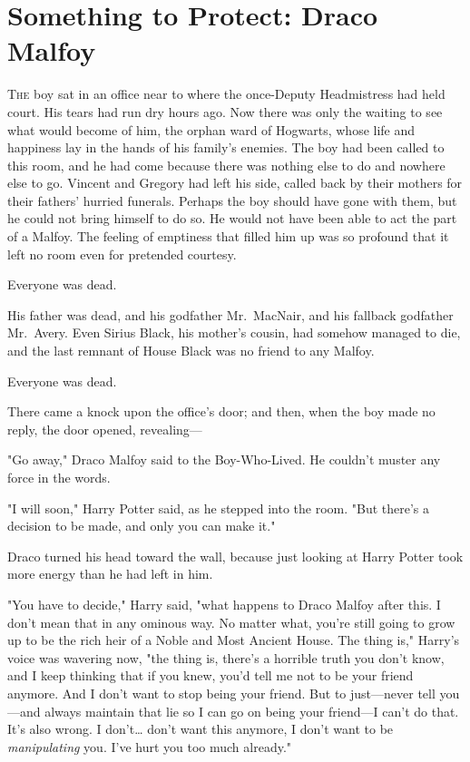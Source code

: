 \chapter{Something to Protect: Draco Malfoy}

\lettrine{T}{he} boy sat in an office near to where the once-Deputy Headmistress had held
court. His tears had run dry hours ago. Now there was only the waiting to see
what would become of him, the orphan ward of Hogwarts, whose life and happiness
lay in the hands of his family's enemies. The boy had been called to this room,
and he had come because there was nothing else to do and nowhere else to go.
Vincent and Gregory had left his side, called back by their mothers for their
fathers' hurried funerals. Perhaps the boy should have gone with them, but he
could not bring himself to do so. He would not have been able to act the part
of a Malfoy. The feeling of emptiness that filled him up was so profound that
it left no room even for pretended courtesy.

Everyone was dead.

His father was dead, and his godfather Mr.~MacNair, and his fallback godfather
Mr.~Avery. Even Sirius Black, his mother's cousin, had somehow managed to die,
and the last remnant of House Black was no friend to any Malfoy.

Everyone was dead.

There came a knock upon the office's door; and then, when the boy made no
reply, the door opened, revealing---

"Go away," Draco Malfoy said to the Boy-Who-Lived. He couldn't muster any force
in the words.

"I will soon," Harry Potter said, as he stepped into the room. "But there's a
decision to be made, and only you can make it."

Draco turned his head toward the wall, because just looking at Harry Potter
took more energy than he had left in him.

"You have to decide," Harry said, "what happens to Draco Malfoy after this. I
don't mean that in any ominous way. No matter what, you're still going to grow
up to be the rich heir of a Noble and Most Ancient House. The thing is,"
Harry's voice was wavering now, "the thing is, there's a horrible truth you
don't know, and I keep thinking that if you knew, you'd tell me not to be your
friend anymore. And I don't want to stop being your friend. But to just---never
tell you---and always maintain that lie so I can go on being your friend---I
can't do that. It's also wrong. I don't{\ldots} don't want this anymore, I
don't want to be \emph{manipulating} you. I've hurt you too much already."

